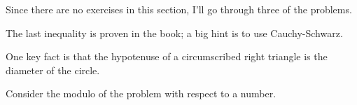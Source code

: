 Since there are no exercises in this section, I'll go through three of the problems. 

\begin{Exercise}
	The last inequality is proven in the book; a big hint is to use Cauchy-Schwarz.
\end{Exercise}

\begin{Exercise}
	One key fact is that the hypotenuse of a circumscribed right triangle is the diameter of the circle.
\end{Exercise}

\begin{Exercise}
	Consider the modulo of the problem with respect to a number.
\end{Exercise}